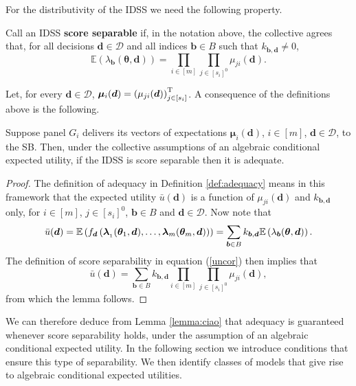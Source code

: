 For the distributivity of the IDSS we need the following property.
\begin{definition}
Call an IDSS \textbf{score separable} if, in the notation above, the collective agrees that, for all decisions $\bm{d}\in \bm{\mathcal{D}}$ and all indices $\bm{b}\in B$ such that $k_{\bm{b},\bm{d}}\neq 0$,
\begin{equation}
\mathbb{E}\left( \lambda _{\bm{b}}(\bm{\theta },\bm{d})\right)=\prod_{i\in[m]}\prod_{j\in[s_i]^0}\mu_{ji}(\bm{d}). \label{uncor}
\end{equation}
\label{def:scoresep}
\end{definition}
 Let, for every $\bm{d}\in\bm{\mathcal{D}}$, $\bm{\mu }_{i}(\bm{d})=\left( \mu _{ji}(\bm{d})\right)^{\textnormal{T}}_{j\in[s_i]}$. A consequence of the definitions above is the following. 

\begin{lemma}
\label{lemma:ciao}
Suppose panel $G_{i}$ delivers its vectors of expectations $\bm{\mu }_{i}(\bm{d})$, $i\in[m]$, $\bm{d}\in\bm{\mathcal{D}}$, to the SB. Then, under the collective assumptions of an algebraic conditional expected utility, if the IDSS is score separable then it is  adequate.
\end{lemma}
\begin{proof}
The definition of adequacy in Definition \ref{def:adequacy} means in this framework that the expected utility $\bar{u}(\bm{d})$ is a function of $\mu_{ji}(\bm{d})$ and $k_{\bm{b},\bm{d}}$ only, for $i\in[m]$, $j\in[s_i]^0$, $\bm{b}\in B$ and $\bm{d}\in\bm{\mathcal{D}}$.  Now note that 
\begin{equation*}
\bar{u}(\bm{d})=\E\left(f_{\bm{d}}\left( \bm{\lambda }_{_{1}}(\bm{\theta }_{1},\bm{d}),\dots,\bm{\lambda }_{m}(\bm{\theta }_{m},\bm{d})\right)\right)= \sum_{\bm{b}\in B}k_{\bm{b},\bm{d}}\E\left(\lambda _{\bm{b}}(\bm{ \theta },\bm{d})\right).\label{eq:nonso}
\end{equation*}
The definition of score separability in equation (\ref{uncor}) then implies that 
\begin{equation*}
\bar{u}(\bm{d})=\sum_{\bm{b}\in B}k_{\bm{b},\bm{d}} \prod_{i\in[m]}\prod_{j\in[s_i]^0}\mu_{ji}(\bm{d}),
\end{equation*}
from which the lemma follows.
\end{proof}

 We can therefore deduce from Lemma \ref{lemma:ciao} that adequacy is guaranteed whenever score separability holds, under the assumption of an algebraic conditional expected utility. In the following section we introduce conditions that ensure this type of separability. We then identify classes of models that give rise to algebraic conditional expected utilities.

